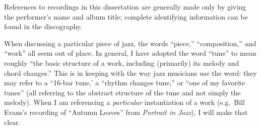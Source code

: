 \documentclass[diss]{subfiles}
\begin{document}
\doublespacing
References to recordings in this dissertation are generally made only by
giving the performer’s name and album title; complete identifying information
can be found in the discography.

When discussing a particular piece of jazz, the words “piece,” “composition,”
and “work” all seem out of place. In general, I have adopted the word “tune”
to mean roughly “the basic structure of a work, including (primarily) its
melody and chord changes.” This is in keeping with the way jazz musicians use
the word: they may refer to a “16-bar tune,' a “rhythm changes tune,” or “one
of my favorite tunes” (all referring to the abstract structure of the tune and
not simply the melody). When I am referencing a \emph{particular}
instantiation of a work (e.g.~Bill Evans’s recording of “Autumn Leaves” from
\emph{Portrait in Jazz}), I will make that clear.

\end{document}
